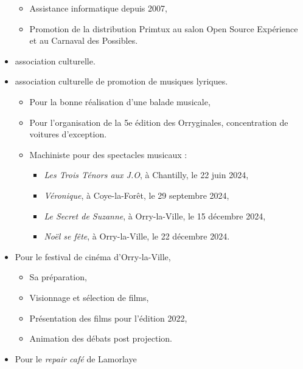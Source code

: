\begin{itemize}
        \begin{itemize}
            \item{Assistance informatique depuis 2007,}
            \item{Promotion de la distribution Primtux au salon Open Source Expérience et au Carnaval des Possibles.}
        \end{itemize}
    \item{ association culturelle.}
    \item{ association culturelle de promotion de musiques lyriques.}
        \begin{itemize}
            \item{Pour la bonne réalisation d'une balade musicale,}
            \item{Pour l'organisation de la 5e édition des Orryginales, concentration de voitures d'exception.}
            \item{Machiniste pour des spectacles musicaux :}
                \begin{itemize}
                    \item{\textit{Les Trois Ténors aux J.O}, à Chantilly, le 22 juin 2024,}
                    \item{\textit{Véronique}, à Coye-la-Forêt, le 29 septembre 2024,}
                    \item{\textit{Le Secret de Suzanne}, à Orry-la-Ville, le 15 décembre 2024,}
                    \item{\textit{Noël se fête}, à Orry-la-Ville, le 22 décembre 2024.}
                \end{itemize}
        \end{itemize}
    \item{Pour le festival de cinéma  d’Orry-la-Ville,}
        \begin{itemize}
            \item{Sa préparation,}
            \item{Visionnage et sélection de films,}
            \item{Présentation des films pour l'édition 2022,}
            \item{Animation des débats post projection.}
        \end{itemize}
    \item{Pour le \textit{repair café}  de Lamorlaye}

\end{itemize}

